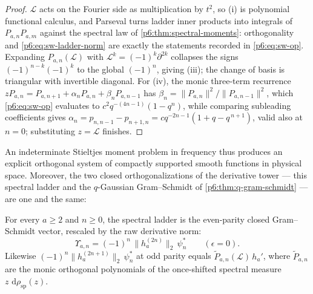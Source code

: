 \documentclass[11pt,oneside]{article}
\numberwithin{equation}{section}
\theoremstyle{definition}
\theoremstyle{remark}
\newcommand{\dd}{\,\mathrm d}
\begin{document}
\begin{proof}
$\mathcal L$ acts on the Fourier side as multiplication by $t^2$, so (i) is
polynomial functional calculus, and Parseval turns ladder inner products
into integrals of $P_{a,n}P_{a,m}$ against the spectral law of
\cref{p6:thm:spectral-moments}: orthogonality and
\eqref{p6:eq:sw-ladder-norm} are exactly the statements recorded in
\eqref{p6:eq:sw-op}.  Expanding $P_{a,n}(\mathcal L)$ with
$\mathcal L^k=(-1)^k\partial^{2k}$ collapses the signs
$(-1)^{n-k}(-1)^k$ to the global $(-1)^n$, giving (iii); the change of basis
is triangular with invertible diagonal.  For (iv), the monic three-term
recurrence $zP_{a,n}=P_{a,n+1}+\alpha_nP_{a,n}+\beta_nP_{a,n-1}$ has
$\beta_n=\|P_{a,n}\|^2/\|P_{a,n-1}\|^2$, which \eqref{p6:eq:sw-op}
evaluates to $c^2q^{-(4n-1)}(1-q^n)$, while comparing subleading
coefficients gives
$\alpha_n=p_{n,n-1}-p_{n+1,n}=cq^{-2n-1}(1+q-q^{\,n+1})$, valid also at
$n=0$; substituting $z=\mathcal L$ finishes.
\end{proof}

An indeterminate Stieltjes moment problem in frequency thus produces an
explicit orthogonal system of compactly supported smooth functions in
physical space.  Moreover, the two closed orthogonalizations of the
derivative tower --- this spectral ladder and the $q$-Gaussian
Gram--Schmidt of \cref{p6:thm:q-gram-schmidt} --- are one and the same:

\begin{proposition}\label{p6:prop:ladder-match}
For every $a\ge2$ and $n\ge0$, the spectral ladder is the even-parity
closed Gram--Schmidt vector, rescaled by the raw derivative norm:
\begin{equation}\label{p6:eq:ladder-match}
 \boxed{\ \Upsilon_{a,n}
 =(-1)^n\,\bigl\|h_a^{(2n)}\bigr\|_2\,\psi_n^{\ast}
 \qquad(\epsilon=0).\ }
\end{equation}
Likewise $(-1)^n\|h_a^{(2n+1)}\|_2\,\psi_n^{\ast}$ at odd parity equals
$\widetilde P_{a,n}(\mathcal L)\,h_a'$, where $\widetilde P_{a,n}$ are the
monic orthogonal polynomials of the once-shifted spectral measure
$z\,\dd\rho_{\mathrm{sp}}(z)$.
\end{proposition}
\end{document}
